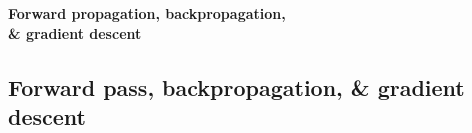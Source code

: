 \documentclass[UKenglish]{beamer}
\begin{document}
\begin{frame}[plain]
    \vspace{2.6cm}
    \begin{center}
    \Huge
        \textcolor{utpgold}{\textbf{Forward propagation, backpropagation,\\ \& gradient descent}}
    \end{center}
\end{frame}

\subsection{Forward pass, backpropagation, \& gradient descent}
\end{document}
